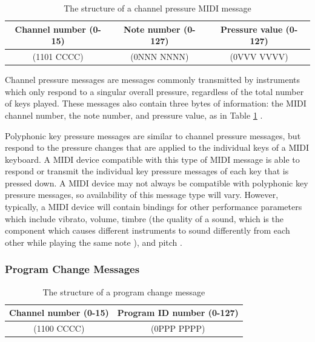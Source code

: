 \begin{table}
	\centering
	\begin{tabular}{|c|c|c|}
	\hline
		Channel number (0-15) & Note number (0-127) & Pressure value (0-127) \\
		\hline
		(1101 CCCC) & (0NNN NNNN) & (0VVV VVVV) \\
	\hline
	\end{tabular}
	\caption{The structure of a channel pressure MIDI message}
	\label{tbl:byte-structure-channel-pressure-messages}
\end{table}

Channel pressure messages are messages commonly transmitted by instruments which only respond to a singular overall pressure, regardless of the total number of keys played. These messages also contain three bytes of information: the MIDI channel number, the note number, and pressure value, as in Table \ref{tbl:byte-structure-channel-pressure-messages} \cite{Huber_2012}. 

Polyphonic key pressure messages are similar to channel pressure messages, but respond to the pressure changes that are applied to the individual keys of a MIDI keyboard. A MIDI device compatible with this type of MIDI message is able to respond or transmit the individual key pressure messages of each key that is pressed down. A MIDI device may not always be compatible with polyphonic key pressure messages, so availability of this message type will vary. However, typically, a MIDI device will contain bindings for other performance parameters which include vibrato, volume, timbre (the quality of a sound, which is the component which causes different instruments to sound differently from each other while playing the same note \cite{Burkholder_Grout_Palisca_2014}), and pitch \cite{McGuire_2014}. 

\subsubsection{Program Change Messages}

\begin{table}
	\centering
	\begin{tabular}{|c|c|}
	\hline
		Channel number (0-15) & Program ID number (0-127) \\
		\hline
		(1100 CCCC) & (0PPP PPPP) \\
	\hline
	\end{tabular}
	\caption{The structure of a program change message}
	\label{tbl:byte-structure-program-change}
\end{table}

